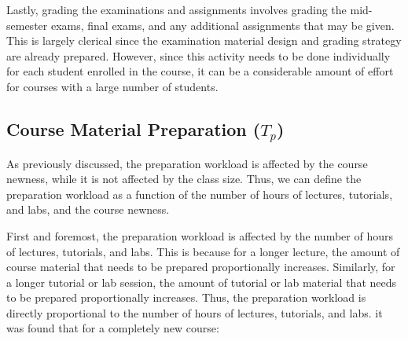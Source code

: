 Lastly, grading the examinations and assignments involves grading the mid-semester exams, final exams, and any additional assignments that may be given. This is largely clerical since the examination material design and grading strategy are already prepared. However, since this activity needs to be done individually for each student enrolled in the course, it can be a considerable amount of effort for courses with a large number of students.

\subsection{Course Material Preparation (\texorpdfstring{\(T_p\)}{})}
\label{sec:preparation_of_course_material}

As previously discussed, the preparation workload is affected by the course newness, while it is not affected by the class size. Thus, we can define the preparation workload as a function of the number of hours of lectures, tutorials, and labs, and the course newness.

First and foremost, the preparation workload is affected by the number of hours of lectures, tutorials, and labs. This is because for a longer lecture, the amount of course material that needs to be prepared proportionally increases. Similarly, for a longer tutorial or lab session, the amount of tutorial or lab material that needs to be prepared proportionally increases. Thus, the preparation workload is directly proportional to the number of hours of lectures, tutorials, and labs. it was found that for a completely new course:

